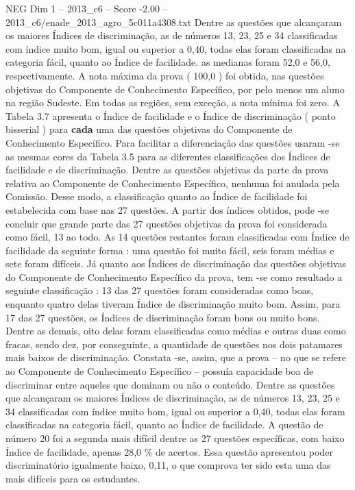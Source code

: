\begin{textsample}{NEG Dim 1 – 2013\_c6 – Score -2.00 – 2013\_c6/enade\_2013\_agro\_5c011a4308.txt}
Dentre as questões que alcançaram os maiores Índices de discriminação, as de números 13, 23, 25 e 34 classificadas com índice muito bom, igual ou superior a 0,40, todas elas foram classificadas na categoria fácil, quanto ao Índice de facilidade. as medianas foram 52,0 e 56,0, respectivamente.
A nota máxima da prova ( 100,0 ) foi obtida, nas questões objetivas do Componente de Conhecimento Específico, por pelo menos um aluno na região Sudeste.
Em todas as regiões, sem exceção, a nota mínima foi zero.
A Tabela 3.7 apresenta o Índice de facilidade e o Índice de discriminação ( ponto bisserial ) para \textbf{cada} uma das questões objetivas do Componente de Conhecimento Específico.
Para facilitar a diferenciação das questões usaram -se as mesmas cores da Tabela 3.5 para as diferentes classificações dos Índices de facilidade e de discriminação.
Dentre as questões objetivas da parte da prova relativa ao Componente de Conhecimento Específico, nenhuma foi anulada pela Comissão.
Desse modo, a classificação quanto ao Índice de facilidade foi estabelecida com base nas 27 questões.
A partir dos índices obtidos, pode -se concluir que grande parte das 27 questões objetivas da prova foi considerada como fácil, 13 ao todo.
As 14 questões restantes foram classificadas com Índice de facilidade da seguinte forma : uma questão foi muito fácil, seis foram médias e sete foram difíceis.
Já quanto aos Índices de discriminação das questões objetivas do Componente de Conhecimento Específico da prova, tem -se como resultado a seguinte classificação : 13 das 27 questões foram consideradas como boas, enquanto quatro delas tiveram Índice de discriminação muito bom.
Assim, para 17 das 27 questões, os Índices de discriminação foram bons ou muito bons.
Dentre as demais, oito delas foram classificadas como médias e outras duas como fracas, sendo dez, por conseguinte, a quantidade de questões nos dois patamares mais baixos de discriminação.
Constata -se, assim, que a prova – no que se refere ao Componente de Conhecimento Específico – possuía capacidade boa de discriminar entre aqueles que dominam ou não o conteúdo.
Dentre as questões que alcançaram os maiores Índices de discriminação, as de números 13, 23, 25 e 34 classificadas com índice muito bom, igual ou superior a 0,40, todas elas foram classificadas na categoria fácil, quanto ao Índice de facilidade.
A questão de número 20 foi a segunda mais difícil dentre as 27 questões específicas, com baixo Índice de facilidade, apenas 28,0 \% de acertos.
Essa questão apresentou poder discriminatório igualmente baixo, 0,11, o que comprova ter sido esta uma das mais difíceis para os estudantes.

\end{textsample}
